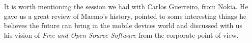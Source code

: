 It is worth mentioning the session we had with Carlos Guerreiro, from Nokia. He gave us a great review of Maemo's history, pointed to some
interesting things he believes the future can bring in the mobile devices world and discussed with us his vision of {\it Free and Open Source Software}
from the corporate point of view.

